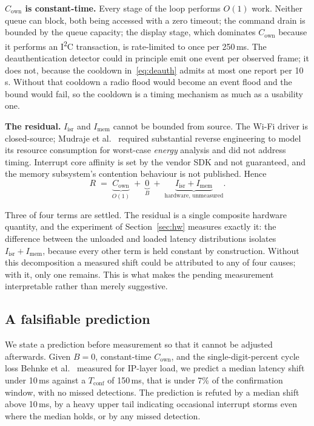 \textbf{$C_{\mathrm{own}}$ is constant-time.} Every stage of the loop performs $O(1)$ work.
Neither queue can block, both being accessed with a zero timeout; the command drain is bounded by
the queue capacity; the display stage, which dominates $C_{\mathrm{own}}$ because it performs an
I\textsuperscript{2}C transaction, is rate-limited to once per 250\,ms. The deauthentication
detector could in principle emit one event per observed frame; it does not, because the cooldown
in~\eqref{eq:deauth} admits at most one report per 10\,s. Without that cooldown a radio flood
would become an event flood and the bound would fail, so the cooldown is a timing mechanism as
much as a usability one.

\textbf{The residual.} $I_{\mathrm{isr}}$ and $I_{\mathrm{mem}}$ cannot be bounded from source.
The Wi-Fi driver is closed-source; Mudraje et al.~\cite{esp32c3re2025} required substantial
reverse engineering to model its resource consumption for worst-case \emph{energy} analysis and
did not address timing. Interrupt core affinity is set by the vendor SDK and not guaranteed, and
the memory subsystem's contention behaviour is not published. Hence
\begin{equation}
R \;=\; \underbrace{C_{\mathrm{own}}}_{O(1)} \;+\; \underbrace{0}_{B} \;+\;
\underbrace{I_{\mathrm{isr}} + I_{\mathrm{mem}}}_{\text{hardware, unmeasured}} .
\label{eq:residual}
\end{equation}

Three of four terms are settled. The residual is a single composite hardware quantity, and the
experiment of Section~\ref{sec:hw} measures exactly it: the difference between the unloaded and
loaded latency distributions isolates $I_{\mathrm{isr}} + I_{\mathrm{mem}}$, because every other
term is held constant by construction. Without this decomposition a measured shift could be
attributed to any of four causes; with it, only one remains. This is what makes the pending
measurement interpretable rather than merely suggestive.

\subsection{A falsifiable prediction}

We state a prediction before measurement so that it cannot be adjusted afterwards. Given $B = 0$,
constant-time $C_{\mathrm{own}}$, and the single-digit-percent cycle loss Behnke
et al.~\cite{behnke2020} measured for IP-layer load, we predict a median latency shift under
10\,ms against a $T_{\mathrm{conf}}$ of 150\,ms, that is under 7\% of the confirmation window,
with no missed detections. The prediction is refuted by a median shift above 10\,ms, by a heavy
upper tail indicating occasional interrupt storms even where the median holds, or by any missed
detection.

